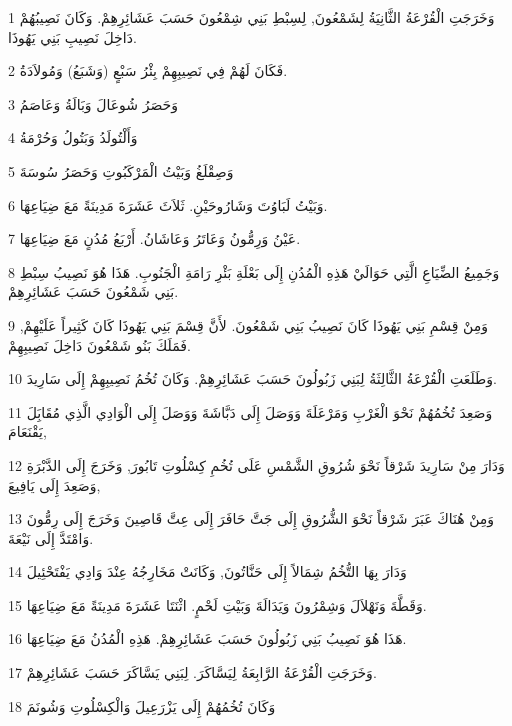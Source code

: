 \par 1 وَخَرَجَتِ الْقُرْعَةُ الثَّانِيَةُ لِشَمْعُونَ, لِسِبْطِ بَنِي شِمْعُونَ حَسَبَ عَشَائِرِهِمْ. وَكَانَ نَصِيبُهُمْ دَاخِلَ نَصِيبِ بَنِي يَهُوذَا.
\par 2 فَكَانَ لَهُمْ فِي نَصِيبِهِمْ بِئْرُ سَبْعٍ (وَشَبَعُ) وَمُولاَدَةُ.
\par 3 وَحَصَرُ شُوعَالَ وَبَالَةُ وَعَاصَمُ
\par 4 وَأَلْتُولَدُ وَبَتُولُ وَحُرْمَةُ
\par 5 وَصِقْلَغُ وَبَيْتُ الْمَرْكَبُوتِ وَحَصَرُ سُوسَةَ
\par 6 وَبَيْتُ لَبَاوُتَ وَشَارُوحَيْنِ. ثَلاَثَ عَشَرَةَ مَدِينَةً مَعَ ضِيَاعِهَا.
\par 7 عَيْنُ وَرِمُّونُ وَعَاتَرُ وَعَاشَانُ. أَرْبَعُ مُدُنٍ مَعَ ضِيَاعِهَا.
\par 8 وَجَمِيعُ الضِّيَاعِ الَّتِي حَوَالَيْ هَذِهِ الْمُدُنِ إِلَى بَعْلَةِ بَئْرِ رَامَةِ الْجَنُوبِ. هَذَا هُوَ نَصِيبُ سِبْطِ بَنِي شَمْعُونَ حَسَبَ عَشَائِرِهِمْ.
\par 9 وَمِنْ قِسْمِ بَنِي يَهُوذَا كَانَ نَصِيبُ بَنِي شَمْعُونَ. لأَنَّ قِسْمَ بَنِي يَهُوذَا كَانَ كَثِيراً عَلَيْهِمْ, فَمَلَكَ بَنُو شَمْعُونَ دَاخِلَ نَصِيبِهِمْ.
\par 10 وَطَلَعَتِ الْقُرْعَةُ الثَّالِثَةُ لِبَنِي زَبُولُونَ حَسَبَ عَشَائِرِهِمْ. وَكَانَ تُخُمُ نَصِيبِهِمْ إِلَى سَارِيدَ.
\par 11 وَصَعِدَ تُخُمُهُمْ نَحْوَ الْغَرْبِ وَمَرْعَلَةَ وَوَصَلَ إِلَى دَبَّاشَةَ وَوَصَلَ إِلَى الْوَادِي الَّذِي مُقَابَِلَ يَقْنَعَامَ,
\par 12 وَدَارَ مِنْ سَارِيدَ شَرْقاً نَحْوَ شُرُوقِ الشَّمْسِ عَلَى تُخُمِ كِسْلُوتِ تَابُورَ, وَخَرَجَ إِلَى الدَّبْرَةِ وَصَعِدَ إِلَى يَافِيعَ,
\par 13 وَمِنْ هُنَاكَ عَبَرَ شَرْقاً نَحْوَ الشُّرُوقِ إِلَى جَتَّ حَافَرَ إِلَى عِتَّ قَاصِينَ وَخَرَجَ إِلَى رِمُّونَ وَامْتَدَّ إِلَى نَيْعَةَ.
\par 14 وَدَارَ بِهَا التُّخُمُ شِمَالاً إِلَى حَنَّاتُونَ, وَكَانَتْ مَخَارِجُهُ عِنْدَ وَادِي يَفْتَحْئِيلَ
\par 15 وَقَطَّةَ وَنَهْلاَلَ وَشِمْرُونَ وَيَدَالَةَ وَبَيْتِ لَحْمٍ. اثْنَتَا عَشَرَةَ مَدِينَةً مَعَ ضِيَاعِهَا.
\par 16 هَذَا هُوَ نَصِيبُ بَنِي زَبُولُونَ حَسَبَ عَشَائِرِهِمْ. هَذِهِ الْمُدُنُ مَعَ ضِيَاعِهَا.
\par 17 وَخَرَجَتِ الْقُرْعَةُ الرَّابِعَةُ لِيَسَّاكَرَ. لِبَنِي يَسَّاكَرَ حَسَبَ عَشَائِرِهِمْ.
\par 18 وَكَانَ تُخُمُهُمْ إِلَى يَزْرَعِيلَ وَالْكِسْلُوتِ وَشُونَمَ
